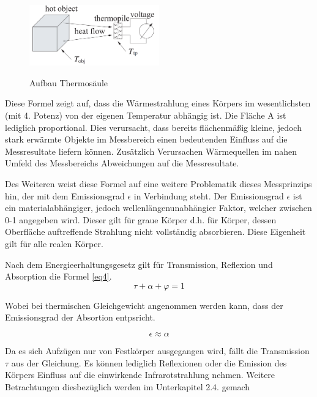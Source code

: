 \begin{figure}[H]
	\centering
	\includegraphics[width=0.5\textwidth]
	{fig/seebeck2.PNG}
	\caption[Aufbau Thermosäule]{Aufbau Thermosäule} \protect\cite{seebeck}
	\label{fig:thermosäule}
\end{figure}

Diese Formel zeigt auf, dass die Wärmestrahlung eines Körpers im wesentlichsten (mit 4. Potenz)
von der eigenen Temperatur abhängig ist. Die Fläche A ist lediglich proportional. Dies verursacht, dass bereits flächenmäßig kleine, jedoch stark erwärmte Objekte im Messbereich einen bedeutenden Einfluss auf die Messresultate liefern können. Zusätzlich Verursachen Wärmequellen im nahen Umfeld des Messbereichs Abweichungen auf die Messresultate.

Des Weiteren weist diese Formel auf eine weitere Problematik dieses Messprinzips hin, der mit dem Emissionsgrad $\epsilon$  in Verbindung steht. Der Emissionsgrad $\epsilon$ ist ein materialabhängiger, jedoch wellenlängenunabhängier Faktor, welcher zwischen 0-1 angegeben wird. Dieser gilt für graue Körper d.h. für Körper, dessen Oberfläche auftreffende Strahlung nicht vollständig absorbieren. Diese Eigenheit gilt für alle realen Körper. 

Nach dem Energieerhaltungsgesetz \protect\cite{Thermoformeln} gilt für Transmission, Reflexion und Absorption die Formel \ref{eq4}.
\begin{equation}
\label{eq4}
\tau  + \alpha + \varphi  = 1
\end{equation}

Wobei bei thermischen Gleichgewicht angenommen werden kann, dass der Emissionsgrad der Absortion entpsricht.

\begin{equation}
\label{eq5}
\epsilon \approx  \alpha
\end{equation}


Da es sich Aufzügen nur von Festkörper ausgegangen wird, fällt die Transmission $\tau$ aus der Gleichung. Es können lediglich Reflexionen oder die Emission des Körpers Einfluss auf die einwirkende Infrarotstrahlung nehmen. Weitere Betrachtungen diesbezüglich werden im Unterkapitel 2.4. gemach

